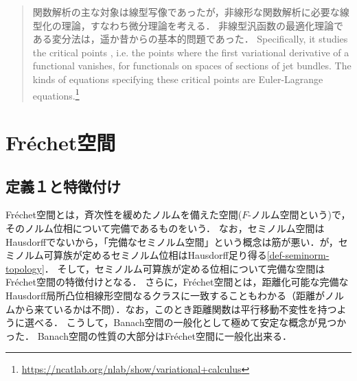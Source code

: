 \documentclass[uplatex,dvipdfmx]{jsreport}
\begin{document}
\begin{quotation}
    関数解析の主な対象は線型写像であったが，非線形な関数解析に必要な線型化の理論，すなわち微分理論を考える．
    非線型汎函数の最適化理論である変分法は，遥か昔からの基本的問題であった．
    Specifically, it studies the critical points , i.e. the points where the first variational derivative of a functional vanishes, for functionals on spaces of sections of jet bundles. The kinds of equations specifying these critical points are Euler-Lagrange equations.\footnote{\url{https://ncatlab.org/nlab/show/variational+calculus}}
\end{quotation}

\section{Fréchet空間}

\subsection{定義１と特徴付け}

\begin{tcolorbox}[colframe=ForestGreen, colback=ForestGreen!10!white,breakable,colbacktitle=ForestGreen!40!white,coltitle=black,fonttitle=\bfseries\sffamily,
title=]
    Fréchet空間とは，斉次性を緩めたノルムを備えた空間($F$-ノルム空間という)で，そのノルム位相について完備であるものをいう．
    なお，セミノルム空間はHausdorffでないから，「完備なセミノルム空間」という概念は筋が悪い．が，セミノルム可算族が定めるセミノルム位相はHausdorff足り得る\ref{def-seminorm-topology}．
    そして，セミノルム可算族が定める位相について完備な空間はFréchet空間の特徴付けとなる．
    さらに，Fréchet空間とは，距離化可能な完備なHausdorff局所凸位相線形空間なるクラスに一致することもわかる（距離がノルムから来ているかは不問）．なお，このとき距離関数は平行移動不変性を持つように選べる．
    こうして，Banach空間の一般化として極めて安定な概念が見つかった．
    Banach空間の性質の大部分はFréchet空間に一般化出来る．
\end{tcolorbox}
\end{document}
